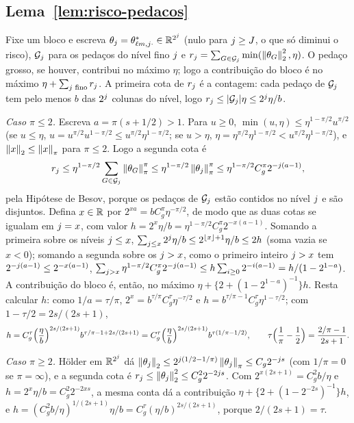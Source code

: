 \documentclass[11pt,a4paper]{article}
\newcommand{\Gcal}{\mathcal{G}}
\begin{document}
\subsection*{Lema~\ref{lem:risco-pedacos}}

Fixe um bloco e escreva $\theta_{j} = \theta^{*}_{\ell m,j\cdot} \in
\mathbb{R}^{2^{j}}$ (nulo para $j \ge J$, o que só diminui o risco),
$\Gcal_{\lev}$ para os pedaços do nível fino $j$ e
$r_{\lev} = \sum_{G\in\Gcal_{\lev}}\min(\norm{\theta_{G}}_{2}^{2},\eta)$.
O pedaço grosso, se houver, contribui no máximo $\eta$; logo a contribuição do
bloco é no máximo $\eta + \sum_{j\text{ fino}}r_{j}$. A primeira cota de
$r_{j}$ é a contagem: cada pedaço de $\Gcal_{\lev}$ tem pelo menos $b$ das
$2^{j}$ colunas do nível, logo $r_{\lev} \le |\Gcal_{\lev}|\eta \le
2^{\lev}\eta/b$.

\emph{Caso $\pi \le 2$.} Escreva $a = \pi(s+1/2) > 1$. Para $u \ge 0$,
$\min(u,\eta) \le \eta^{1-\pi/2}u^{\pi/2}$ (se $u \le \eta$,
$u = u^{\pi/2}u^{1-\pi/2} \le u^{\pi/2}\eta^{1-\pi/2}$; se $u > \eta$,
$\eta = \eta^{\pi/2}\eta^{1-\pi/2} < u^{\pi/2}\eta^{1-\pi/2}$), e
$\left\lVert x \right\rVert_{2} \le \left\lVert x \right\rVert_{\pi}$ para $\pi \le 2$. Logo a segunda cota é
\[
  r_{\lev} \le \eta^{1-\pi/2}\sum_{G\in\Gcal_{\lev}}\norm{\theta_{G}}_{\pi}^{\pi}
  \le \eta^{1-\pi/2}\norm{\theta_{\lev}}_{\pi}^{\pi}
  \le \eta^{1-\pi/2}C_{g}^{\pi}2^{-\lev(a-1)},
\]
pela Hipótese de Besov, porque os pedaços de $\Gcal_{\lev}$ estão contidos no
nível $j$ e são disjuntos. Defina $x \in \mathbb{R}$ por
$2^{xa} = bC_{g}^{\pi}\eta^{-\pi/2}$, de modo que as duas cotas se igualam em
$j = x$, com valor $h = 2^{x}\eta/b = \eta^{1-\pi/2}C_{g}^{\pi}2^{-x(a-1)}$.
Somando a primeira sobre os níveis $j \le x$,
$\sum_{j\le x}2^{j}\eta/b \le 2^{\lfloor x\rfloor+1}\eta/b \le 2h$ (soma
vazia se $x < 0$); somando a segunda sobre os $j > x$, como o primeiro
inteiro $j > x$ tem $2^{-j(a-1)} \le 2^{-x(a-1)}$,
$\sum_{j>x}\eta^{1-\pi/2}C_{g}^{\pi}2^{-j(a-1)} \le
h\sum_{i\ge0}2^{-i(a-1)} = h/(1-2^{1-a})$. A contribuição do bloco é, então,
no máximo $\eta + \{2 + (1-2^{1-a})^{-1}\}h$. Resta calcular $h$: como
$1/a = \tau/\pi$, $2^{x} = b^{\tau/\pi}C_{g}^{\tau}\eta^{-\tau/2}$ e
$h = b^{\tau/\pi-1}C_{g}^{\tau}\eta^{1-\tau/2}$; com $1 - \tau/2 =
2s/(2s+1)$,
\[
  h = C_{g}^{\tau}\Bigl(\frac{\eta}{b}\Bigr)^{2s/(2s+1)}
  b^{\tau/\pi - 1 + 2s/(2s+1)}
  = C_{g}^{\tau}\Bigl(\frac{\eta}{b}\Bigr)^{2s/(2s+1)}
  b^{\tau(1/\pi-1/2)},
  \qquad \tau\Bigl(\frac1\pi - \frac12\Bigr) = \frac{2/\pi - 1}{2s+1}.
\]

\emph{Caso $\pi \ge 2$.} Hölder em $\mathbb{R}^{2^{j}}$ dá
$\left\lVert \theta_{j} \right\rVert_{2} \le 2^{j(1/2-1/\pi)}\left\lVert \theta_{j} \right\rVert_{\pi}
\le C_{g}2^{-j s}$ (com $1/\pi = 0$ se $\pi = \infty$), e a segunda cota é
$r_{j} \le \left\lVert \theta_{j} \right\rVert_{2}^{2} \le C_{g}^{2}2^{-2j s}$. Com
$2^{x(2s+1)} = C_{g}^{2}b/\eta$ e $h = 2^{x}\eta/b = C_{g}^{2}2^{-2xs}$, a
mesma conta dá a contribuição $\eta + \{2 + (1-2^{-2s})^{-1}\}h$, e
$h = (C_{g}^{2}b/\eta)^{1/(2s+1)}\eta/b = C_{g}^{\tau}(\eta/b)^{2s/(2s+1)}$,
porque $2/(2s+1) = \tau$.
\end{document}
